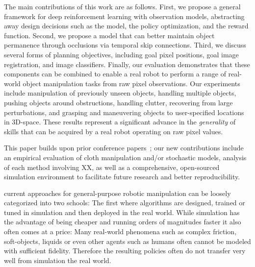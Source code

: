 The main contributions of this work are as follows. First, we propose a general framework for deep reinforcement learning with observation models, abstracting away design decisions such as the model, the policy optimization, and the reward function.
Second, we propose a model that can better maintain object permanence through occlusions via temporal skip connections.
Third, we discuss several forms of planning objectives, including goal pixel positions, goal image registration, and image classifiers.
Finally, our evaluation demonstrates that these components can be combined to enable a real robot to perform a range of real-world object manipulation tasks from raw pixel observations. Our experiments include manipulation of previously unseen objects, handling multiple objects, pushing objects around obstructions, handling clutter, recovering from large perturbations, and grasping and maneuvering objects to user-specified locations in 3D-space. These results represent a significant advance in the \emph{generality} of skills that can be acquired by a real robot operating on raw pixel values.

This paper builds upon prior conference papers~\cite{todo}; our new contributions include an empirical evaluation of cloth manipulation and/or stochastic models, analysis of each method involving XX, as well as a comprehensive, open-sourced simulation environment to facilitate future research and better reproducibility.






\iffalse

current approaches for general-purpose robotic manipulation can be loosely categorized into two schools: The first where algorithms are designed, trained or tuned in simulation and then deployed in the real world. While simulation has the advantage of being cheaper and running orders of magnitudes faster it also often comes at a price: Many real-world phenomena such as complex friction, soft-objects, liquids or even other agents such as humans often cannot be modeled with sufficient fidelity. Therefore the resulting policies often do not transfer very well from simulation the real world.

